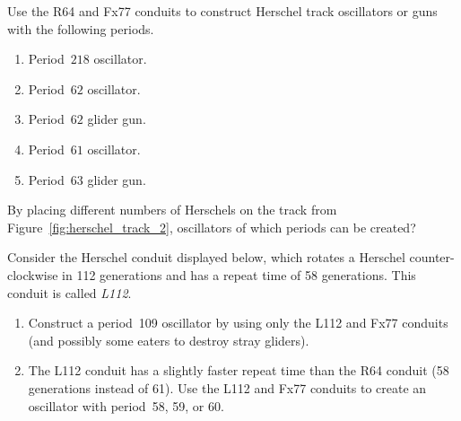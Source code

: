 \begin{multicols}{2}
	
	\mfilbreak
	
	
	\begin{problem}\label{exer:herschel_track_1}
		Use the R64 and Fx77 conduits to construct Herschel track oscillators or guns with the following periods.
		
		
		\begin{enumerate}[label=\bf\color{ocre}(\alph*)]
			\item Period~$218$ oscillator.
			
			\item Period~$62$ oscillator.
			
			\item Period~$62$ glider gun.
			
			\item Period~$61$ oscillator.
			
			\item Period~$63$ glider gun.
		\end{enumerate}
	\end{problem}
	
	
	\mfilbreak
	
	
	\begin{problem}\label{exer:herschel_track_2_what_periods}
		By placing different numbers of Herschels on the track from Figure~\ref{fig:herschel_track_2}, oscillators of which periods can be created?
	\end{problem}
	
	
	\mfilbreak
	
	
	\begin{problem}\label{exer:herschel_track_L112}
		Consider the Herschel conduit displayed below, which rotates a Herschel counter-clockwise in 112 generations and has a repeat time of 58 generations. This conduit is called \emph{L112}.
		
		\begin{center}
		\end{center}
		
		\begin{enumerate}[label=\bf\color{ocre}(\alph*)]
			\item Construct a period~109 oscillator by using only the L112 and Fx77 conduits (and possibly some eaters to destroy stray gliders).
			
			\item The L112 conduit has a slightly faster repeat time than the R64 conduit (58 generations instead of 61). Use the L112 and Fx77 conduits to create an oscillator with period~58, 59, or 60.
		\end{enumerate}
	\end{problem}
	

\end{multicols}
